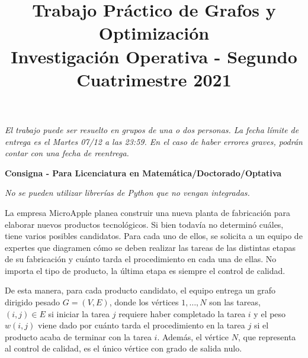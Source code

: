\documentclass{article}
\title{Trabajo Práctico de Grafos y Optimización \\
\large Investigación Operativa - Segundo Cuatrimestre 2021}
\author{}
\date{}
\begin{document}
\maketitle

\textit{El trabajo puede ser resuelto en grupos de una o dos personas. La fecha límite de entrega es el Martes 07/12 a las 23:59. En el caso de haber errores graves, podrán contar con una fecha de reentrega.}

\vspace*{\baselineskip}
\textbf{Consigna - Para Licenciatura en Matemática/Doctorado/Optativa}
\vspace*{\baselineskip}

\textit{No se pueden utilizar librerías de Python que no vengan integradas.}

La empresa MicroApple planea construir una nueva planta de fabricación para elaborar nuevos productos tecnológicos. Si bien todavía no determinó cuáles, tiene varios posibles candidatos. Para cada uno de ellos, se solicita a un equipo de expertes que diagramen cómo se deben realizar las tareas de las distintas etapas de su fabricación y cuánto tarda el procedimiento en cada una de ellas. No importa el tipo de producto, la última etapa es siempre el control de calidad.

De esta manera, para cada producto candidato, el equipo entrega un grafo dirigido pesado $G=(V,E)$, donde los vértices $1,\dots, N$ son las tareas, $(i,j)\in E$ si iniciar la tarea $j$ requiere haber completado la tarea $i$ y el peso $w(i,j)$ viene dado por cuánto tarda el procedimiento en la tarea $j$ si el producto acaba de terminar con la tarea $i$. Además, el vértice $N$, que representa al control de calidad, es el único vértice con grado de salida nulo.
\end{document}
